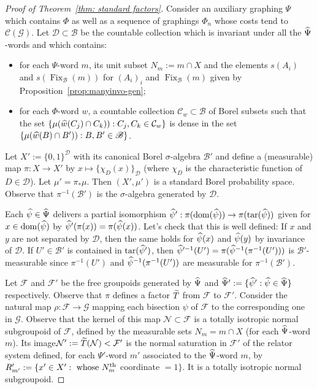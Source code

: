 \documentclass[10pt]{amsart}
\theoremstyle{definition}
\newcommand{\cost}{\mathcal{C}}
\newcommand{\cn}{\mathcal{N}}
\newcommand{\cg}{\mathcal{G}}
\newcommand{\cf}{\mathcal{F}}
\newcommand{\cd}{\mathcal{D}}
\newcommand{\rb}{\mathscr{B}}
\DeclareMathOperator{\dom}{dom}
\DeclareMathOperator{\tar}{tar}
\DeclareMathOperator{\Fix}{Fix}
\let\oldtilde\tilde
\renewcommand*{\tilde}[1]{\mathchoice{\widetilde{#1}}{\widetilde{#1}}{\oldtilde{#1}}{\oldtilde{#1}}}
\let\oldhat\hat
\renewcommand*{\hat}[1]{\mathchoice{\widehat{#1}}{\widehat{#1}}{\oldhat{#1}}{\oldhat{#1}}}
\begin{document}
\begin{proof}[Proof of Theorem~\ref{thm: standard factors}]
Consider an auxiliary graphing $\Psi$ which contains $\Phi$ as well as a sequence of graphings $\Phi_n$ whose costs tend to $\cost (\cg)$. Let $\cd\subset \rb$ be the countable collection which is invariant under all the $\hat{\Psi}$-words and which contains:
\begin{itemize}
\item for each $\Psi$-word $m$, its unit subset $N_m:=m\cap X$ and the elements $s(A_i)$ and $s(\Fix_{\rb}(m))$ for $(A_i)_i$ and $\Fix_{\rb}(m)$ given by Proposition~\ref{prop:manyinvo-gen};
\item for each $\Phi$-word $w$, a countable collection $\cost_{w}\subset \rb$ of Borel subsets such that the set $\{\mu(\hat{w}(C_j)\cap C_k)): C_j, C_k\in \cost_{w}\}$ is dense in the set $\{\mu(\hat{w}(B)\cap B')): B, B'\in \rb\}$.
\end{itemize}
Let $X':=\{0,1\}^{\cd}$ with its canonical Borel $\sigma$-algebra $\rb'$ and define a (measurable) map $\pi:X\to X'$ by $x\mapsto \{\chi_{D}(x)\}_{\cd}$ (where $\chi_{D}$ is the characteristic function of $D\in \cd$). Let $\mu'=\pi_*\mu$. Then $(X',\mu')$ is a standard Borel probability space. Observe that $\pi^{-1}(\rb')$ is the $\sigma$-algebra generated by $\cd$.

Each $\hat{\psi}\in \hat{\Psi}$ delivers a partial isomorphism $\hat{\psi}':\pi(\dom(\hat{\psi}))\to \pi(\tar(\hat{\psi}))$ given for $x\in \dom(\hat{\psi})$ by $\hat{\psi}'(\pi(x))=\pi(\hat{\psi} (x))$. Let's check that this is well defined: If $x$ and $y$ are not separated by $\cd$, then the same holds for $\hat{\psi}(x)$ and $\hat{\psi}(y)$ by invariance of $\cd$. If $U'\in \rb'$ is contained in $\tar(\hat{\psi}')$, then $\hat{\psi}'^{-1}(U')=\pi(\hat{\psi}^{-1}(\pi^{-1} (U')))$ is $\rb'$-measurable since $\pi^{-1} (U')$ and $\hat{\psi}^{-1}(\pi^{-1} (U'))$ are measurable for $\pi^{-1}(\rb')$.

Let $\cf$ and $\cf'$ be the free groupoids generated by $\hat{\Psi}$ and $\hat{\Psi}':=\{\hat{\psi}': \hat{\psi}\in \hat{\Psi}\}$ respectively. Observe that $\pi$ defines a factor $\tilde{T}$ from $\cf$ to $\cf'$. Consider the natural map $\rho:\cf\to\cg$ mapping each bisection $\psi$ of $\cf$ to the corresponding one in $\cg$. Observe that the kernel of this map $\cn\subset \cf$ is a totally isotropic normal subgroupoid of $\cf$, defined by the measurable sets $N_m=m\cap X$ (for each $\hat{\Psi}$-word $m$). Its image\linebreak$\cn' :=\tilde{T}(\cn)<\cf'$ is the normal saturation in $\cf'$ of the relator system defined, for each $\Psi'$-word $m'$ associated to the $\hat{\Psi}$-word $m$, by $R'_{m'}:=\{x'\in X': \text{ whose } N_m^{\rm th}$  coordinate $=1\}$. It is a totally isotropic normal subgroupoid.


\end{proof}
\end{document}
